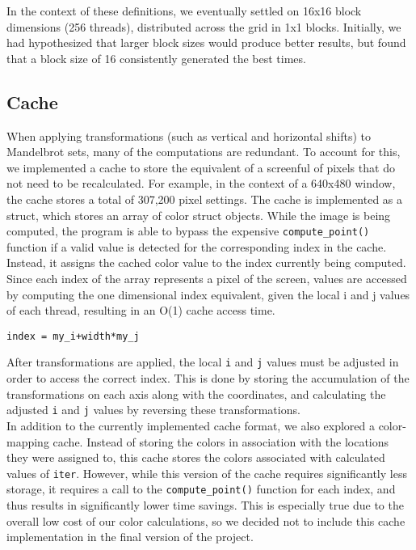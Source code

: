\documentclass{article}
\begin{document}
In the context of these definitions, we eventually settled on 16x16 block 
dimensions (256 threads), distributed across the grid in 1x1 blocks.
Initially, we had hypothesized that larger block sizes would produce better
results, but found that a block size of 16 consistently generated the best 
times.

\subsection{Cache}

When applying transformations (such as vertical and horizontal shifts) to
Mandelbrot sets, many of the computations are redundant.
To account for this, we implemented a cache to store the equivalent of a
screenful of pixels that do not need to be recalculated.
For example, in the context of a 640x480 window, the cache stores a total 
of 307,200 pixel settings.
The cache is implemented as a struct, which stores an array of color struct
objects.
While the image is being computed, the program is able to bypass the 
expensive \verb|compute_point()| function if a valid value is detected for
the corresponding index in the cache.
Instead, it assigns the cached color value to the index currently being 
computed.
Since each index of the array represents a pixel of the screen, values are
accessed by computing the one dimensional index equivalent, given the local
i and j values of each thread, resulting in an O(1) cache access time.

\begin{verbatim}
index = my_i+width*my_j
\end{verbatim}

After transformations are applied, the local \verb|i| and \verb|j| values
must be adjusted in order to access the correct index.
This is done by storing the accumulation of the transformations on each 
axis along with the coordinates, and calculating the adjusted \verb|i| and
\verb|j| values by reversing these transformations.\\

In addition to the currently implemented cache format, we also explored a
color-mapping cache.
Instead of storing the colors in association with the locations they were 
assigned to, this cache stores the colors associated with calculated values
of \verb|iter|.
However, while this version of the cache requires significantly less 
storage, it requires a call to the \verb|compute_point()| function for each
index, and thus results in significantly lower time savings.
This is especially true due to the overall low cost of our color 
calculations, so we decided not to include this cache implementation in the
final version of the project.
\end{document}
